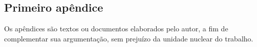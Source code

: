 \documentclass[
	12pt,				%
	openright,			%
	oneside,
	a4paper,				%
	english,				%
	brazil				%
]{abntex2/abntex2} %
\begin{document}








\postextual
{}



\begin{apendicesenv}

\chapter{Primeiro apêndice}

Os apêndices são textos ou documentos elaborados pelo autor, a fim de complementar sua argumentação, sem prejuízo da unidade nuclear do trabalho.

\end{apendicesenv}
\end{document}
